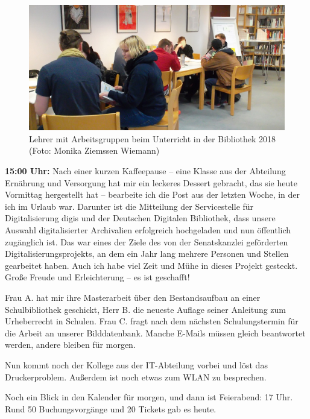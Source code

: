 \documentclass[a4paper,
fontsize=11pt,
oneside,
numbers=noperiodatend,
parskip=half-,
bibliography=totoc,
final
]{scrartcl}
\begin{document}
\begin{figure}
\centering
\includegraphics{img/LV_2018_1.jpg}
\caption{Lehrer mit Arbeitsgruppen beim Unterricht in der Bibliothek
2018 (Foto: Monika Ziemssen Wiemann)}
\end{figure}

\textbf{15:00 Uhr:} Nach einer kurzen Kaffeepause -- eine Klasse aus der
Abteilung Ernährung und Versorgung hat mir ein leckeres Dessert
gebracht, das sie heute Vormittag hergestellt hat -- bearbeite ich die
Post aus der letzten Woche, in der ich im Urlaub war. Darunter ist die
Mitteilung der Servicestelle für Digitalisierung digis und der Deutschen
Digitalen Bibliothek, dass unsere Auswahl digitalisierter Archivalien
erfolgreich hochgeladen und nun öffentlich zugänglich ist. Das war eines
der Ziele des von der Senatskanzlei geförderten
Digitalisierungsprojekts, an dem ein Jahr lang mehrere Personen und
Stellen gearbeitet haben. Auch ich habe viel Zeit und Mühe in dieses
Projekt gesteckt. Große Freude und Erleichterung -- es ist geschafft!

Frau A. hat mir ihre Masterarbeit über den Bestandsaufbau an einer
Schulbibliothek geschickt, Herr B. die neueste Auflage seiner Anleitung
zum Urheberrecht in Schulen. Frau C. fragt nach dem nächsten
Schulungstermin für die Arbeit an unserer Bilddatenbank. Manche E-Mails
müssen gleich beantwortet werden, andere bleiben für morgen.

Nun kommt noch der Kollege aus der IT-Abteilung vorbei und löst das
Druckerproblem. Außerdem ist noch etwas zum WLAN zu besprechen.

Noch ein Blick in den Kalender für morgen, und dann ist Feierabend: 17
Uhr. Rund 50 Buchungsvorgänge und 20 Tickets gab es heute.
\end{document}
